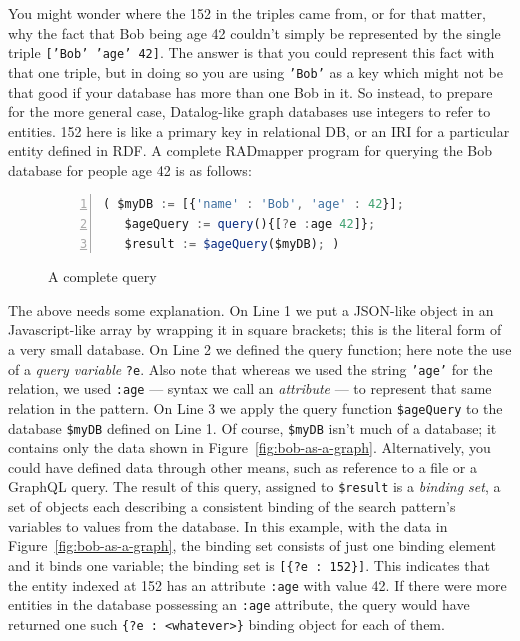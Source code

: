 \documentclass[9pt,letterpaper]{article}
\newcommand{\stt}[1]{\texttt{#1}} %
\begin{document}
You might wonder where the 152 in the triples came from, or for that matter, why the fact that Bob being age 42 couldn't
simply be represented by the single triple \stt{['Bob' 'age' 42]}.
The answer is that you could represent this fact with that one triple, but in doing so you are using \stt{'Bob'} as a key
which might not be that good if your database has more than one Bob in it.
So instead, to prepare for the more general case, Datalog-like graph databases use integers to refer to entities.
152 here is like a primary key in relational DB, or an IRI for a particular entity defined in RDF.
A complete RADmapper program for querying the Bob database for people age 42 is as follows:

\begin{figure}[H]
  \caption{A complete query}
  \label{code:bob-age}
\begin{lstlisting}[language=JavaScript,numberstyle=\scriptsize,basicstyle=\ttfamily\scriptsize,numbers=left,stepnumber=1,breaklines=true]
 ( $myDB := [{'name' : 'Bob', 'age' : 42}];
   $ageQuery := query(){[?e :age 42]};
   $result := $ageQuery($myDB); )
\end{lstlisting}
\end{figure} \vspace{-2em}

The above needs some explanation.
On Line 1 we put a JSON-like object in an Javascript-like array by wrapping it in square brackets; this is the literal form of a very small database.
On Line 2 we defined the query function; here note the use of a \textit{query variable} \stt{?e}.
Also note that whereas we used the string \stt{'age'} for the relation, we used \stt{:age} --- syntax we call an \textit{attribute} --- to represent that same relation in the pattern.
On Line 3 we apply the query function \stt{\$ageQuery} to the database \stt{\$myDB} defined on Line 1.
Of course, \stt{\$myDB} isn't much of a database; it contains only the data shown in Figure~\ref{fig:bob-as-a-graph}.
Alternatively, you could have defined data through other means, such as reference to a file or a GraphQL query.
The result of this query, assigned to \stt{\$result} is a \textit{binding set}, a set of objects each describing a consistent binding of the search pattern's variables to values from the database.
In this example, with the data in Figure~\ref{fig:bob-as-a-graph}, the binding set consists of just one binding element and it binds one variable; the binding set is \stt{[\{?e : 152\}]}.
This indicates that the entity indexed at 152 has an attribute \stt{:age} with value 42.
If there were more entities in the database possessing an \stt{:age} attribute, the query would have returned one such \stt{\{?e : <whatever>\}}
binding object for each of them.
\end{document}
